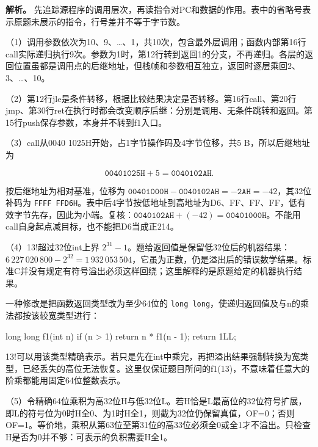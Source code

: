 \textbf{解析。} 先追踪源程序的调用层次，再读指令对PC和数据的作用。表中的省略号表示原题未展示的指令，行号差并不等于字节数。

（1）调用参数依次为10、9、\ldots、1，共10次，包含最外层调用；函数内部第16行call实际递归执行9次。参数为1时，第12行转到返回1的分支，不再递归。各层的返回位置虽都是调用点的后继地址，但栈帧和参数相互独立，返回时逐层乘回2、3、\ldots、10。

（2）第12行jle是条件转移，根据比较结果决定是否转移。第16行call、第20行jmp、第30行ret在执行时都会改变顺序后继：分别是调用、无条件跳转和返回。第15行push保存参数，本身并不转到f1入口。

（3）call从0040 1025H开始，占1字节操作码及4字节位移，共5 B，所以后继地址为

\[
\mathtt{00401025H}+5=\mathtt{0040102AH}.
\]

按后继地址为相对基准，位移为 \(\mathtt{00401000H}-\mathtt{0040102AH}=-\mathtt{2AH}=-42\)，其32位补码为 \texttt{FFFF FFD6H}。表中后4字节按低地址到高地址为D6、FF、FF、FF，低有效字节先存，因此为小端。复核：\(\mathtt{0040102AH}+(-42)=\mathtt{00401000H}\)。不能用call自身起点减目标，也不能把D6当成正214。

（4）13!超过32位int上界 \(2^{31}-1\)。题给返回值是保留低32位后的机器结果：\(6\,227\,020\,800-2^{32}=1\,932\,053\,504\)，它虽为正数，仍是溢出后的错误数学结果。标准C并没有规定有符号溢出必须这样回绕；这里解释的是原题给定的机器执行结果。

一种修改是把函数返回类型改为至少64位的 \texttt{long long}，使递归返回值及与n的乘法都按该较宽类型进行：

\par\medskip\noindent\begin{minipage}{\linewidth}
\begin{codeblock}[language=C]
long long f1(int n) {
    if (n > 1)
        return n * f1(n - 1);
    return 1LL;
}
\end{codeblock}
\end{minipage}\par\medskip

13!可以用该类型精确表示。若只是先在int中乘完，再把溢出结果强制转换为宽类型，已经丢失的高位无法恢复。这里仅保证题目所问的f1(13)，不意味着任意大的阶乘都能用固定64位整数表示。

（5）令精确64位乘积为高32位H与低32位L。若H恰是L最高位的32位符号扩展，即L的符号位为0时H全0、为1时H全1，则截为32位仍保留真值，OF=0；否则OF=1。等价地，乘积从第63位至第31位的高33位必须全0或全1才不溢出。只检查H是否为0并不够：可表示的负积需要H全1。

